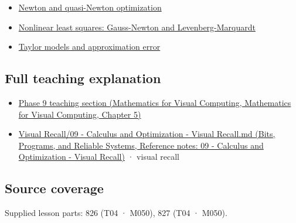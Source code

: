 \begin{itemize}
\tightlist
\item
  \hyperref[appendix-54c8f5828387]{Newton and quasi-Newton optimization}
\item
  \hyperref[appendix-2c2df8345991]{Nonlinear least squares: Gauss-Newton and Levenberg-Marquardt}
\item
  \hyperref[appendix-32f39e9a3738]{Taylor models and approximation error}
\end{itemize}

\subsection{Full teaching explanation}\label{appendix-6ac071f8b50c-full-teaching-explanation}

\begin{itemize}
\tightlist
\item
  \href{../02-Mathematics-for-Visual-Computing/main.pdf\#nameddest=02-foundations-ii-ch021-jacobians-curvature-and-local-approximation}{Phase 9 teaching section (Mathematics for Visual Computing, Mathematics for Visual Computing, Chapter 5)}
\item
  \href{../01-Bits-Programs-and-Reliable-Systems/main.pdf\#nameddest=appendix-adf48f5dc5c1}{Visual Recall/09 - Calculus and Optimization - Visual Recall.md (Bits, Programs, and Reliable Systems, Reference notes: 09 - Calculus and Optimization - Visual Recall)} · visual recall
\end{itemize}

\subsection{Source coverage}\label{appendix-6ac071f8b50c-source-coverage}

Supplied lesson parts: 826 (T04 · M050), 827 (T04 · M050).
